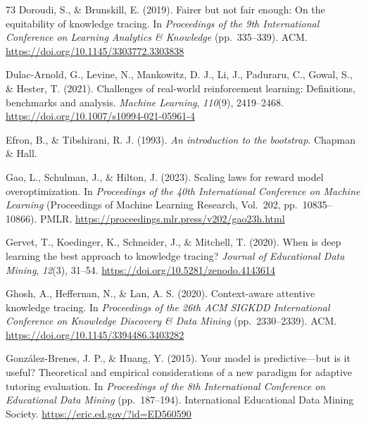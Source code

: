 \documentclass[a4paper,preprint,12pt,authoryear]{elsarticle}
\begin{document}
\begin{thebibliography}{73}
Doroudi, S., \& Brunskill, E. (2019). Fairer but not fair enough: On the equitability of knowledge tracing. In \textit{Proceedings of the 9th International Conference on Learning Analytics \& Knowledge} (pp.~335--339). ACM. \url{https://doi.org/10.1145/3303772.3303838}

Dulac-Arnold, G., Levine, N., Mankowitz, D. J., Li, J., Paduraru, C., Gowal, S., \& Hester, T. (2021). Challenges of real-world reinforcement learning: Definitions, benchmarks and analysis. \textit{Machine Learning}, \textit{110}(9), 2419--2468. \url{https://doi.org/10.1007/s10994-021-05961-4}

Efron, B., \& Tibshirani, R. J. (1993). \textit{An introduction to the bootstrap}. Chapman \& Hall.

Gao, L., Schulman, J., \& Hilton, J. (2023). Scaling laws for reward model overoptimization. In \textit{Proceedings of the 40th International Conference on Machine Learning} (Proceedings of Machine Learning Research, Vol.~202, pp.~10835--10866). PMLR. \url{https://proceedings.mlr.press/v202/gao23h.html}

Gervet, T., Koedinger, K., Schneider, J., \& Mitchell, T. (2020). When is deep learning the best approach to knowledge tracing? \textit{Journal of Educational Data Mining}, \textit{12}(3), 31--54. \url{https://doi.org/10.5281/zenodo.4143614}

Ghosh, A., Heffernan, N., \& Lan, A. S. (2020). Context-aware attentive knowledge tracing. In \textit{Proceedings of the 26th ACM SIGKDD International Conference on Knowledge Discovery \& Data Mining} (pp.~2330--2339). ACM. \url{https://doi.org/10.1145/3394486.3403282}

González-Brenes, J. P., \& Huang, Y. (2015). Your model is predictive---but is it useful? Theoretical and empirical considerations of a new paradigm for adaptive tutoring evaluation. In \textit{Proceedings of the 8th International Conference on Educational Data Mining} (pp.~187--194). International Educational Data Mining Society. \url{https://eric.ed.gov/?id=ED560590}


\end{thebibliography}
\end{document}
